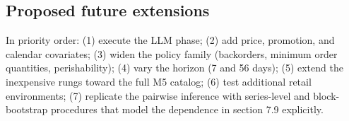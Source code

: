 \subsection{Proposed future extensions}
\label{sec:l-future}
In priority order: (1) execute the LLM phase; (2) add price, promotion, and
calendar covariates; (3) widen the policy family (backorders, minimum order
quantities, perishability); (4) vary the horizon (7 and 56 days); (5) extend
the inexpensive rungs toward the full M5 catalog; (6) test additional retail
environments; (7) replicate the pairwise inference with series-level and
block-bootstrap procedures that model the dependence in section 7.9
explicitly.
